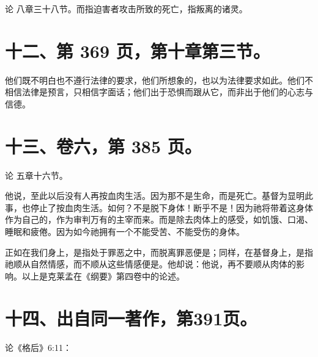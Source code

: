 论  八章三十八节。而指迫害者攻击所致的死亡，指叛离的诸灵。\par


\section{十二、第 369 页，第十章第三节。}

他们既不明白也不遵行法律的要求，他们所想象的，也以为法律要求如此。他们不相信法律是预言，只相信字面话；他们出于恐惧而跟从它，而非出于他们的心志与信德。\par


\section{十三、卷六，第 385 页。}

论  五章十六节。\par

他说，至此以后没有人再按血肉生活。因为那不是生命，而是死亡。基督为显明此事，也停止了按血肉生活。如何？不是脱下身体！断乎不是！因为祂将带着这身体作为自己的，作为审判万有的主宰而来。而是除去肉体上的感受，如饥饿、口渴、睡眠和疲倦。因为如今祂拥有一个不能受苦、不能受伤的身体。\par

正如在我们身上，是指处于罪恶之中，而脱离罪恶便是；同样，在基督身上，是指祂顺从自然情感，而不顺从这些情感便是。他却说：他说，再不要顺从肉体的影响。以上是克莱孟在《纲要》第四卷中的论述。\par


\section{十四、出自同一著作，第391页。}

论《格后》6:11：\par

